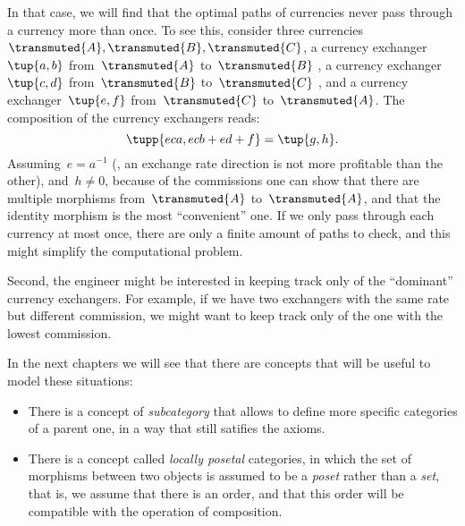 In that case, we will find that the optimal paths of currencies never pass through a currency more than once. To see this, consider three currencies~$\transmuted{A},\transmuted{B},\transmuted{C}$, a currency exchanger~$\tup{a,b}$ from~$\transmuted{A}$ to~$\transmuted{B}$ , a currency exchanger~$\tup{c,d}$ from~$\transmuted{B}$ to~$\transmuted{C}$ , and a currency exchanger~$\tup{e,f}$ from~$\transmuted{C}$ to~$\transmuted{A}$.
The composition of the currency exchangers reads:
\begin{equation*}
  \tupp{eca, ecb+ed+f}=\tup{g,h}.
\end{equation*}
Assuming~$e=a^{-1}$ (\ie , an exchange rate direction is not more profitable than the other), and~$h\neq 0$, because of the commissions one can show that there are multiple morphisms from~$\transmuted{A}$ to~$\transmuted{A}$, and that the identity morphism is the most ``convenient'' one.
If we only pass through each currency at most once, there are only a finite amount of paths to check, and this might simplify the computational problem.

Second, the engineer might be interested in keeping track only of the ``dominant'' currency exchangers.
For example, if we have two exchangers with the same rate but different commission, we might want to keep track only of the one with the lowest commission.

In the next chapters we will see that there are concepts that will be useful to model these situations:
\begin{itemize}
  \item There is a concept of \emph{subcategory} that allows to define more specific
  categories of a parent one, in a way that still satifies the axioms.
  \item There is a concept called \emph{locally posetal} categories, in which the
  set of morphisms between two objects is assumed to be a \emph{poset} rather than a \emph{set},
  that is, we assume that there is an order, and that this order will be compatible with the operation of composition.
\end{itemize}
